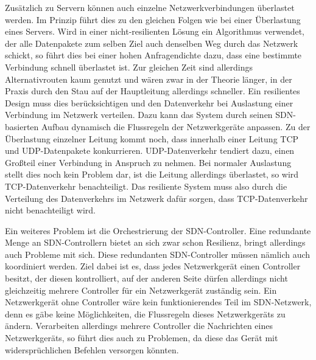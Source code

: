Zusätzlich zu Servern können auch einzelne Netzwerkverbindungen überlastet werden. Im Prinzip führt dies zu den gleichen Folgen wie bei einer Überlastung eines Servers. 
Wird in einer nicht-resilienten Lösung ein Algorithmus verwendet, der alle Datenpakete zum selben Ziel auch denselben Weg durch das Netzwerk schickt, so führt dies bei einer hohen Anfragendichte dazu, 
dass eine bestimmte Verbindung schnell überlastet ist. Zur gleichen Zeit sind allerdings Alternativrouten kaum genutzt und wären zwar in der Theorie länger, 
in der Praxis durch den Stau auf der Hauptleitung allerdings schneller. Ein resilientes Design muss dies berücksichtigen und den Datenverkehr bei Auslastung einer Verbindung im Netzwerk verteilen. 
Dazu kann das System durch seinen \ac{SDN}-basierten Aufbau dynamisch die Flussregeln der Netzwerkgeräte anpassen. Zu der Überlastung einzelner Leitung kommt noch, dass innerhalb einer Leitung \ac{TCP} und \ac{UDP}-Datenpakete konkurrieren. 
\ac{UDP}-Datenverkehr tendiert dazu, einen Großteil einer Verbindung in Anspruch zu nehmen. Bei normaler Auslastung stellt dies noch kein Problem dar, ist die Leitung allerdings überlastet, so wird \ac{TCP}-Datenverkehr benachteiligt. 
Das resiliente System muss also durch die Verteilung des Datenverkehrs im Netzwerk dafür sorgen, dass \ac{TCP}-Datenverkehr nicht benachteiligt wird.

Ein weiteres Problem ist die Orchestrierung der \ac{SDN}-Controller. Eine redundante Menge an \ac{SDN}-Controllern bietet an sich zwar schon Resilienz, bringt allerdings auch Probleme mit sich. 
Diese redundanten \ac{SDN}-Controller müssen nämlich auch koordiniert werden. Ziel dabei ist es, dass jedes Netzwerkgerät einen Controller besitzt, der diesen kontrolliert, 
auf der anderen Seite dürfen allerdings nicht gleichzeitig mehrere Controller für ein Netzwerkgerät zuständig sein. Ein Netzwerkgerät ohne Controller wäre kein funktionierendes Teil im \ac{SDN}-Netzwerk, 
denn es gäbe keine Möglichkeiten, die Flussregeln dieses Netzwerkgeräts zu ändern. Verarbeiten allerdings mehrere Controller die Nachrichten eines Netzwerkgeräts, so führt dies auch zu Problemen, 
da diese das Gerät mit widersprüchlichen Befehlen versorgen könnten.




